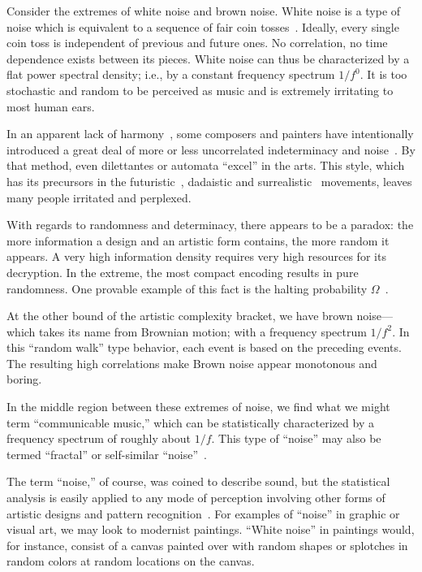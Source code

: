 \documentclass[%
 reprint,
 showpacs,
 showkeys,
 amsmath,
 amssymb,
 aps,
 pra,
 longbibliography,
 floatfix,
 ]{revtex4-1}
\begin{document}
Consider the extremes of white noise and brown noise. White
noise is a type of noise which is equivalent to a sequence of fair coin tosses~\cite{diaconis:211}.
Ideally, every single coin toss is independent of previous and future ones.
No correlation, no time dependence exists between its pieces.
White noise can thus be characterized by a flat power spectral density;
i.e., by a constant frequency spectrum $1/f^0$.
It is too stochastic and random to be perceived as music and is extremely irritating to most human ears.

In an apparent lack of harmony~\cite{Cage-autobio}, some composers and painters have intentionally introduced a great deal of more or less uncorrelated indeterminacy and noise~\cite{Sangild}.
By that method, even dilettantes or automata ``excel'' in the arts.
This style, which has its precursors in the futuristic~\cite{Russolo-1913},
dadaistic and surrealistic~\cite{breton:30,breton:33} movements,
leaves many people irritated and perplexed.

With regards to randomness and determinacy, there appears to be a paradox: the more information a design and an artistic form contains, the more random it appears.
A very high information density requires very high resources for its decryption.
In the extreme, the most compact encoding results in pure randomness.
One provable example of this fact is the halting probability $\Omega$~\cite{chaitin2,chaitin3,calude:02}.


At the other bound of the artistic complexity bracket, we have brown noise---which takes its name from Brownian motion;
with a frequency spectrum $1/f^2$.
In this ``random walk'' type behavior, each event is based on the preceding events.
The resulting high correlations make Brown noise appear monotonous and boring.


In the middle region between these extremes of noise, we find what we might term
``communicable music,'' which can be statistically characterized by a frequency spectrum of roughly about $1/f$.
This type of ``noise'' may also be termed ``fractal'' or self-similar ``noise''~\cite{voss-75,voss-78,gard-78,taylor-99,Bigerelle20002179}.


The term ``noise,'' of course, was coined to describe sound, but the
statistical analysis is easily applied to any mode of perception involving other forms of artistic designs and
pattern recognition~\cite{bovill}. For examples of ``noise'' in graphic or visual art, we
may look to modernist paintings. ``White noise'' in paintings would, for instance, consist of a canvas painted over with random shapes or splotches in random
colors at random locations on the canvas.
\end{document}
